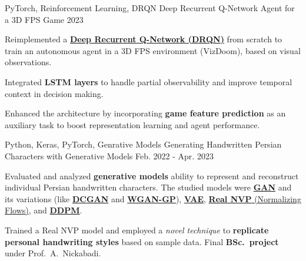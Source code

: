 \begin{cventries}
\cventry
    {PyTorch, Reinforcement Learning, DRQN} %
    {Deep Recurrent Q-Network Agent for a 3D FPS Game} %
    {} %
    {2023} %
    {
      \begin{cvitems}
        \item {Reimplemented a \textbf{\href{https://arxiv.org/pdf/1609.05521}{Deep Recurrent Q-Network (DRQN)}} from scratch to train an autonomous agent in a 3D FPS environment (VizDoom), based on visual observations.}
        \item {Integrated \textbf{LSTM layers} to handle partial observability and improve temporal context in decision making.}
        \item {Enhanced the architecture by incorporating \textbf{game feature prediction} as an auxiliary task to boost representation learning and agent performance.}
      \end{cvitems}
    }

  \cventry
    {Python, Keras, PyTorch, Genrative Models} %
    {Generating Handwritten Persian Characters with Generative Models} %
    {} %
    {Feb. 2022 - Apr. 2023} %
    {
      \begin{cvitems} %
      	\item {Evaluated and analyzed  \textbf{generative models} ability to represent and reconstruct individual Persian handwritten characters. The studied models were \href{https://arxiv.org/abs/1406.2661}{\textbf{GAN}} and its variations (like \href{https://arxiv.org/abs/1511.06434}{\textbf{DCGAN}} and \href{https://arxiv.org/abs/1704.00028}{\textbf{WGAN-GP}}), \href{https://arxiv.org/abs/1312.6114}{\textbf{VAE}}, \href{https://arxiv.org/abs/1605.08803}{\textbf{Real NVP} (Normalizing Flows)}, and \href{https://arxiv.org/abs/2006.11239}{\textbf{DDPM}}.}
      	\item{Trained a Real NVP model and employed a \textit{novel technique} to \textbf{replicate personal handwriting styles} based on sample data. Final \textbf{BSc.~project} under Prof.~A.~Nickabadi.}
      \end{cvitems}
    }



\end{cventries}
